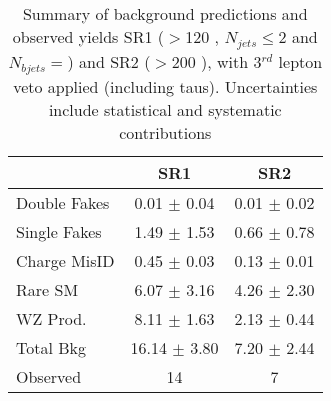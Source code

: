 \begin{table}[htb!]
  \begin{center}
    \caption{Summary of background predictions and observed yields SR1 (\MET$>$120 \GeV, $N_{jets} \leq 2$ and $N_{bjets} = $) and SR2 (\MET$>$200 \GeV), with 3$^{rd}$ lepton veto applied (including taus). Uncertainties include statistical and systematic contributions}
    \label{tab:SSYields}
    \vspace{0.3cm}
    \begin{tabular}{l||c|c}
      \hline \hline
               &      SR1          &   SR2             \\ \hline
Double Fakes   &  0.01 $\pm$  0.04 & 0.01 $\pm$  0.02 \\ 
Single Fakes   &  1.49 $\pm$  1.53 & 0.66 $\pm$  0.78 \\ 
Charge MisID   &  0.45 $\pm$  0.03 & 0.13 $\pm$  0.01 \\ 
Rare SM        &  6.07 $\pm$  3.16 & 4.26 $\pm$  2.30 \\ 
WZ Prod.       &  8.11 $\pm$  1.63 & 2.13 $\pm$  0.44 \\ \hline 
Total Bkg      & 16.14 $\pm$  3.80 & 7.20 $\pm$  2.44 \\ \hline 
Observed       & 14                &   7              \\ 

      \hline \hline
    \end{tabular}
  \end{center}
\end{table}
